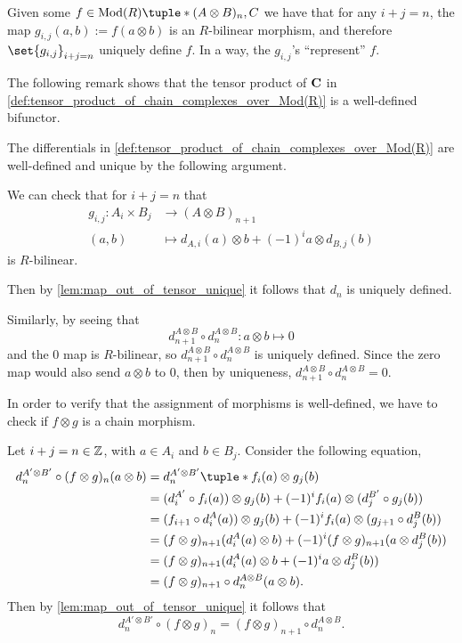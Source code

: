 Given some \( f \in \Mod(R)\tuple*{ (A \otimes B)_n, C } \) we have that for any \( i + j = n \), the map \( g_{i, j}(a, b) := f(a \otimes b) \) is an \( R \)-bilinear morphism, and therefore \( \set{g_{i, j}}_{i + j = n} \) uniquely define \( f \). In a way, the \( g_{i, j} \)'s ``represent'' \( f \).

The following remark shows that the tensor product of \( \operatorname{\mathbf{C}} \) in \autoref{def:tensor_product_of_chain_complexes_over_Mod(R)} is a well-defined bifunctor.

\begin{remark}
    \label{rem:c_tensor_bifunctor}
    The differentials in \autoref{def:tensor_product_of_chain_complexes_over_Mod(R)} are well-defined and unique by the following argument.

    We can check that for \( i + j = n \) that
    \begin{align*}
        g_{i, j}: A_i \times B_j &\to (A \otimes B)_{n + 1} \\
        (a, b) &\mapsto d_{A, i}(a) \otimes b + (-1)^i a \otimes d_{B, j}(b)
    \end{align*}
    is \( R \)-bilinear.

    Then by \autoref{lem:map_out_of_tensor_unique} it follows that \( d_n \) is uniquely defined.

    Similarly, by seeing that
    \[
        d_{n + 1}^{A \otimes B} \circ d_n^{A \otimes B}: a \otimes b \mapsto 0
    \]
    and the \( 0 \) map is \( R \)-bilinear, so \( d_{n + 1}^{A \otimes B} \circ d_n^{A \otimes B} \) is uniquely defined. Since the zero map would also send \( a \otimes b \) to \( 0 \), then by uniqueness, \( d_{n + 1}^{A \otimes B} \circ d_n^{A \otimes B} = 0 \).

    In order to verify that the assignment of morphisms is well-defined, we have to check if \( f \otimes g \) is a chain morphism.
    
    Let \( i + j = n \in {\mathbb{Z}} \), with \( a \in A_i \) and \( b \in B_j \). Consider the following equation,
    \begin{align*}
        d_n^{A' \otimes B'} \circ (f \otimes g)_n (a \otimes b) &= d_n^{A' \otimes B'} \tuple*{ f_i(a) \otimes g_j(b) } \\
        &= (d_i^{A'} \circ f_i(a)) \otimes g_j(b) + (-1)^i f_i(a) \otimes (d_j^{B'} \circ g_j(b)) \\
        &= (f_{i + 1} \circ d_i^A (a)) \otimes g_j (b) + (-1)^i f_i(a) \otimes (g_{j + 1} \circ d_j^B(b)) \\
        &= (f \otimes g)_{n + 1} (d_i^A(a) \otimes b) + (-1)^i (f \otimes g)_{n + 1} (a \otimes d_j^B(b)) \\
        &= (f \otimes g)_{n + 1} (d_i^A (a) \otimes b + (-1)^i a \otimes d_j^B (b)) \\
        &= (f \otimes g)_{n + 1} \circ d_n^{A \otimes B} (a \otimes b).
    \end{align*}
    Then by \autoref{lem:map_out_of_tensor_unique} it follows that
    \[
        d_n^{A' \otimes B'} \circ (f \otimes g)_n = (f \otimes g)_{n + 1} \circ d_n^{A \otimes B}.
    \]


\end{remark}
